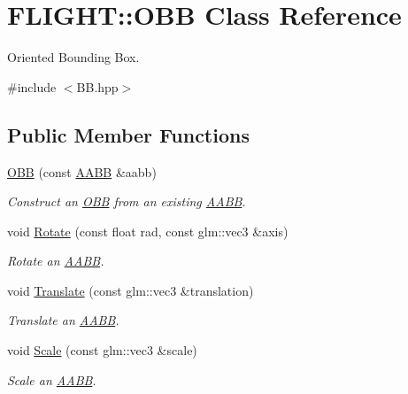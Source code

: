 \hypertarget{class_f_l_i_g_h_t_1_1_o_b_b}{}\section{F\+L\+I\+G\+HT\+:\+:O\+BB Class Reference}
\label{class_f_l_i_g_h_t_1_1_o_b_b}


Oriented Bounding Box.  




{\ttfamily \#include $<$B\+B.\+hpp$>$}

\subsection*{Public Member Functions}
\begin{DoxyCompactItemize}
\item 
\hyperlink{class_f_l_i_g_h_t_1_1_o_b_b_aa1709a538455c1fea5b62638eaae6830}{O\+BB} (const \hyperlink{class_f_l_i_g_h_t_1_1_a_a_b_b}{A\+A\+BB} \&aabb)
\begin{DoxyCompactList}\small\item\em Construct an \hyperlink{class_f_l_i_g_h_t_1_1_o_b_b}{O\+BB} from an existing \hyperlink{class_f_l_i_g_h_t_1_1_a_a_b_b}{A\+A\+BB}. \end{DoxyCompactList}\item 
void \hyperlink{class_f_l_i_g_h_t_1_1_o_b_b_ad6554a26d30c35ca3f25314d735adc5d}{Rotate} (const float rad, const glm\+::vec3 \&axis)
\begin{DoxyCompactList}\small\item\em Rotate an \hyperlink{class_f_l_i_g_h_t_1_1_a_a_b_b}{A\+A\+BB}. \end{DoxyCompactList}\item 
void \hyperlink{class_f_l_i_g_h_t_1_1_o_b_b_a5e9c1eba7ba4f883e9155665c3723647}{Translate} (const glm\+::vec3 \&translation)
\begin{DoxyCompactList}\small\item\em Translate an \hyperlink{class_f_l_i_g_h_t_1_1_a_a_b_b}{A\+A\+BB}. \end{DoxyCompactList}\item 
void \hyperlink{class_f_l_i_g_h_t_1_1_o_b_b_a4c62330309d2812cb03a4da434b39f1e}{Scale} (const glm\+::vec3 \&scale)
\begin{DoxyCompactList}\small\item\em Scale an \hyperlink{class_f_l_i_g_h_t_1_1_a_a_b_b}{A\+A\+BB}. \end{DoxyCompactList}\item 

\end{DoxyCompactItemize}
